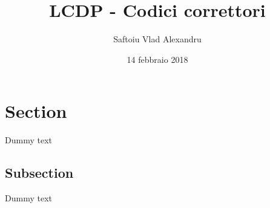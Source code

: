 \documentclass{article}
\title{LCDP - Codici correttori}
\date{14 febbraio 2018}
\author{Saftoiu Vlad Alexandru}
\begin{document}
	\maketitle
	\newpage

	\tableofcontents
	\newpage

	\section{Section}

	Dummy text

	\subsection{Subsection}

	Dummy text
\end{document}
